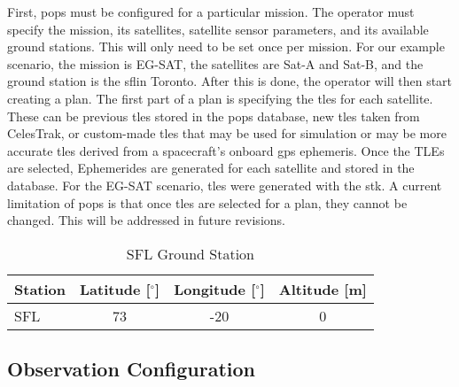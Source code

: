 First, \gls{pops} must be configured for a particular mission. The operator
must specify the mission, its satellites, satellite sensor parameters, and its
available ground stations. This will only need to be set once per mission. For
our example scenario, the mission is EG-SAT, the satellites are Sat-A and
Sat-B, and the ground station is the \gls{sfl}in Toronto. After this is done,
the operator will then start creating a plan. The first part of a plan is
specifying the \glspl{tle} for each satellite. These can be previous
\glspl{tle} stored in the \gls{pops} database, new \glspl{tle} taken from
CelesTrak, or custom-made \glspl{tle} that may be used for simulation or may be
more accurate \glspl{tle} derived from a spacecraft’s onboard \gls{gps}
ephemeris.  Once the TLEs are selected, Ephemerides are generated for each
satellite and stored in the database. For the EG-SAT scenario, \glspl{tle} were
generated with the \gls{stk}. A current limitation of \gls{pops} is that once
\glspl{tle} are selected for a plan, they cannot be changed. This will be
addressed in future revisions. 

\begin{table}[h] 
    \centering
    \caption{SFL Ground Station}
    \begin{tabular}{cccc}
	Station                  & Latitude [$^\circ$] & Longitude [$^\circ$] & Altitude [m] \\ \hline
	\multicolumn{1}{l|}{SFL} & 73       & -20      & 0        \\
    \end{tabular}
    \label{tab:ground-stations}
\end{table}

\subsection{Observation Configuration}


